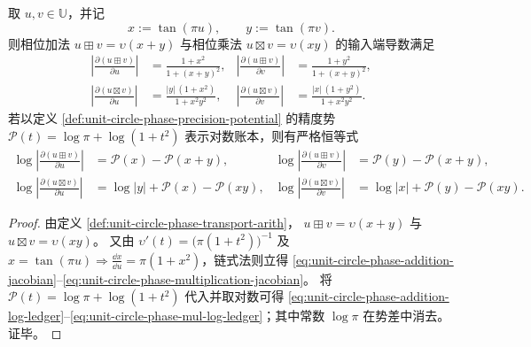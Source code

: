 \begin{proposition}\label{prop:unit-circle-phase-log-condition-numbers}
取 \(u,v\in\mathbb{U}\)，并记
\[
x:=\tan(\pi u),\qquad y:=\tan(\pi v).
\]
则相位加法 \(u\boxplus v=\upsilon(x+y)\) 与相位乘法 \(u\boxtimes v=\upsilon(xy)\) 的输入端导数满足
\begin{align}
\left|\frac{\partial(u\boxplus v)}{\partial u}\right|
&=\frac{1+x^2}{1+(x+y)^2},
&
\left|\frac{\partial(u\boxplus v)}{\partial v}\right|
&=\frac{1+y^2}{1+(x+y)^2},\label{eq:unit-circle-phase-addition-jacobian}\\[4pt]
\left|\frac{\partial(u\boxtimes v)}{\partial u}\right|
&=\frac{|y|\,(1+x^2)}{1+x^2y^2},
&
\left|\frac{\partial(u\boxtimes v)}{\partial v}\right|
&=\frac{|x|\,(1+y^2)}{1+x^2y^2}.\label{eq:unit-circle-phase-multiplication-jacobian}
\end{align}
若以定义 \ref{def:unit-circle-phase-precision-potential} 的精度势 \(\mathcal{P}(t)=\log\pi+\log(1+t^2)\) 表示对数账本，则有严格恒等式
\begin{align}
\log\left|\frac{\partial(u\boxplus v)}{\partial u}\right|
&=\mathcal{P}(x)-\mathcal{P}(x+y),
&
\log\left|\frac{\partial(u\boxplus v)}{\partial v}\right|
&=\mathcal{P}(y)-\mathcal{P}(x+y),\label{eq:unit-circle-phase-addition-log-ledger}\\[4pt]
\log\left|\frac{\partial(u\boxtimes v)}{\partial u}\right|
&=\log|y|+\mathcal{P}(x)-\mathcal{P}(xy),
&
\log\left|\frac{\partial(u\boxtimes v)}{\partial v}\right|
&=\log|x|+\mathcal{P}(y)-\mathcal{P}(xy).\label{eq:unit-circle-phase-mul-log-ledger}
\end{align}
\end{proposition}
\begin{proof}
由定义 \ref{def:unit-circle-phase-transport-arith}，
\(
u\boxplus v=\upsilon(x+y)
\)
与
\(
u\boxtimes v=\upsilon(xy)
\)。
又由 \(\upsilon'(t)=\bigl(\pi(1+t^2)\bigr)^{-1}\) 及 \(x=\tan(\pi u)\Rightarrow \frac{\dd x}{\dd u}=\pi(1+x^2)\)，链式法则立得 \eqref{eq:unit-circle-phase-addition-jacobian}--\eqref{eq:unit-circle-phase-multiplication-jacobian}。
将 \(\mathcal{P}(t)=\log\pi+\log(1+t^2)\) 代入并取对数可得 \eqref{eq:unit-circle-phase-addition-log-ledger}--\eqref{eq:unit-circle-phase-mul-log-ledger}；其中常数 \(\log\pi\) 在势差中消去。证毕。
\end{proof}

